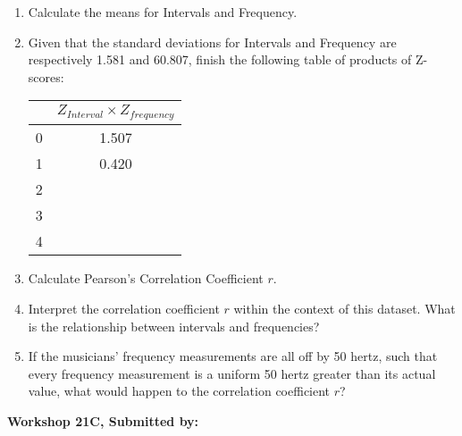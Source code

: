 \documentclass[11pt]{book}\usepackage[]{graphicx}\usepackage[]{color}
\begin{document}
\begin{exercises}
\begin{exercise}
\begin{enumerate}
  \item Calculate the means for Intervals and Frequency.
  \item	Given that the standard deviations for Intervals and Frequency are respectively 1.581 and 60.807, finish the following table of products of Z-scores:

{\small{
\begin{center}
\begin{tabular}{@{} rc @{}} \hline
	& $Z_{Interval} \times Z_{frequency}$ \\ \hline
0& 	1.507 \\
1&	0.420  \\
2	& \\
3	& \\
4	& \\ \hline
\end{tabular}
\end{center}
}}

  \item	Calculate Pearson's Correlation Coefficient $r$.
  \item Interpret the correlation coefficient $r$ within the context of this dataset.  What is the relationship between intervals and frequencies?
  \item If the musicians' frequency measurements are all off by 50 hertz, such that every frequency measurement is a uniform 50 hertz greater than its actual value, what would happen to the correlation coefficient $r$?
\end{enumerate}

\end{exercise}
\begin{solution}  %

\end{solution}


\clearpage

    \begin{exercise}  %

    \begin{center}
\begin{flushleft}\textbf{\large \hfill Workshop 21C, Submitted by: }\end{flushleft}

\end{center}
\end{exercise}
\end{exercises}
\end{document}
